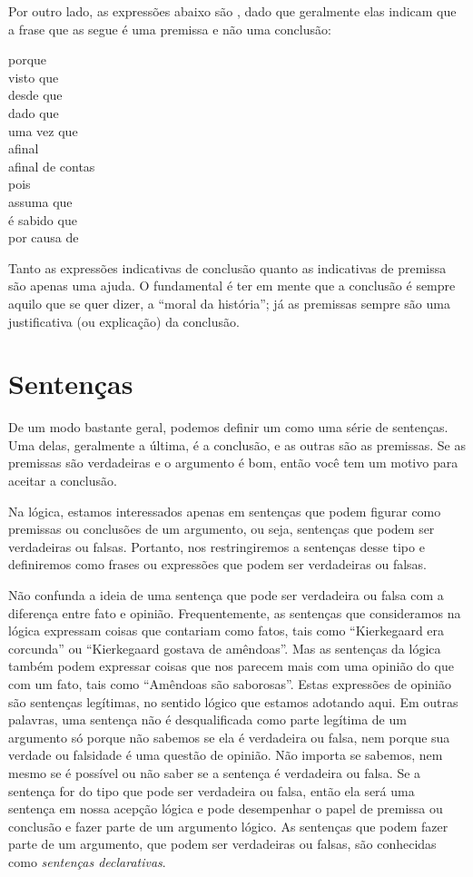Por outro lado, as expressões abaixo são , dado que geralmente elas indicam que a frase que as segue é uma premissa e não uma conclusão:
	\begin{center}
		porque\\ visto que\\ desde que\\ dado que\\ uma vez que\\ afinal\\ afinal de contas\\ pois\\ assuma que\\ é sabido que\\ por causa de
	\end{center}
Tanto as expressões indicativas de conclusão quanto as indicativas de premissa são apenas uma ajuda.
O fundamental é ter em mente que a conclusão é sempre aquilo que se quer dizer, a ``moral da história''; já as premissas sempre são uma justificativa (ou explicação) da conclusão. 

\section{Sentenças}
\label{intro.sentences}

De um modo bastante geral, podemos definir um  como uma série de sentenças.
Uma delas, geralmente a última, é a conclusão, e as outras são as premissas.
Se as premissas são verdadeiras e o argumento é bom, então você tem um motivo para aceitar a conclusão.

Na lógica, estamos interessados apenas em sentenças que podem figurar como premissas ou conclusões de um argumento, ou seja, sentenças que podem ser verdadeiras ou falsas.
Portanto, nos restringiremos a sentenças desse tipo e definiremos  como frases ou expressões que podem ser verdadeiras ou falsas.

Não confunda a ideia de uma sentença que pode ser verdadeira ou falsa com a diferença entre fato e opinião.
Frequentemente, as sentenças que consideramos na lógica expressam coisas que contariam como fatos, tais como ``Kierkegaard era corcunda'' ou ``Kierkegaard gostava de amêndoas''.
Mas as sentenças da lógica também podem expressar coisas que nos parecem mais com uma opinião do que com um fato, tais como ``Amêndoas são saborosas''.
Estas expressões de opinião são sentenças legítimas, no sentido lógico que estamos adotando aqui.
Em outras palavras, uma sentença não é desqualificada como parte legítima de um argumento só porque não sabemos se ela é verdadeira ou falsa, nem porque sua verdade ou falsidade é uma questão de opinião.
Não importa se sabemos, nem mesmo se é possível ou não saber se a sentença é verdadeira ou falsa.
Se a sentença for do tipo que pode ser verdadeira ou falsa, então ela será uma sentença em nossa acepção lógica  e pode desempenhar o papel de premissa ou conclusão e fazer parte de um argumento lógico.
As sentenças que podem fazer parte de um argumento, que podem ser verdadeiras ou falsas, são conhecidas como \emph{sentenças declarativas}.

